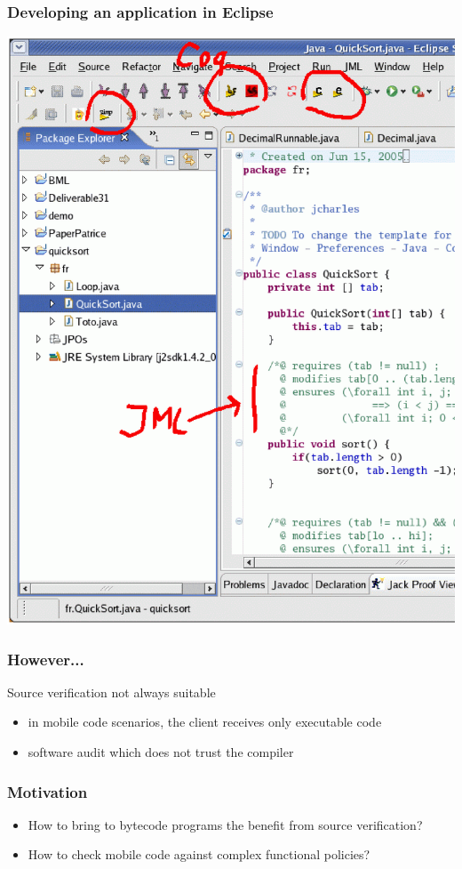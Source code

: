 \documentclass{beamer}
\begin{document}
\begin{frame}\frametitle{Developing an application in Eclipse}
\vspace*{-1.5em}
\includegraphics[height=\textheight]{figs/screen1.ps}
\end{frame}

\begin{frame}\frametitle{However...}
  Source verification not always suitable
   \begin{itemize}
     \item in mobile code  scenarios, the client receives only executable code   
     \item software audit which does not trust the compiler
   \end{itemize}  
\end{frame}



\begin{frame}\frametitle{Motivation}
  \begin{itemize}
   \item How  to  bring to bytecode programs the benefit from source verification?
     \item How to check mobile code against complex functional policies? 
  \end{itemize}
\end{frame}
\end{document}
